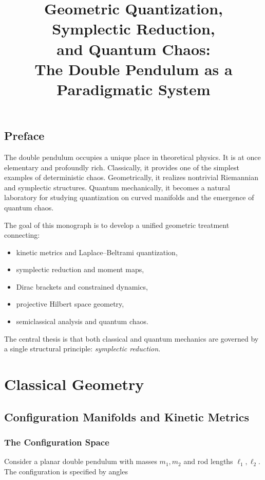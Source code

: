 \documentclass[11pt]{book}
\title{Geometric Quantization, Symplectic Reduction,\\
and Quantum Chaos:\\
The Double Pendulum as a Paradigmatic System}
\author{}
\date{}
\begin{document}
\maketitle

\tableofcontents

\chapter*{Preface}

The double pendulum occupies a unique place in theoretical physics.
It is at once elementary and profoundly rich.
Classically, it provides one of the simplest examples of deterministic chaos.
Geometrically, it realizes nontrivial Riemannian and symplectic structures.
Quantum mechanically, it becomes a natural laboratory for studying
quantization on curved manifolds and the emergence of quantum chaos.

The goal of this monograph is to develop a unified geometric treatment
connecting:

\begin{itemize}
\item kinetic metrics and Laplace--Beltrami quantization,
\item symplectic reduction and moment maps,
\item Dirac brackets and constrained dynamics,
\item projective Hilbert space geometry,
\item semiclassical analysis and quantum chaos.
\end{itemize}

The central thesis is that both classical and quantum mechanics
are governed by a single structural principle:
\emph{symplectic reduction}.

\part{Classical Geometry}

\chapter{Configuration Manifolds and Kinetic Metrics}

\section{The Configuration Space}

Consider a planar double pendulum with masses $m_1,m_2$
and rod lengths $\ell_1,\ell_2$.
The configuration is specified by angles
\end{document}
